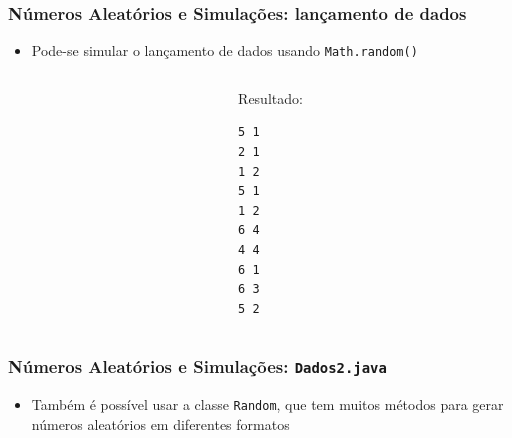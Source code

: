 \documentclass[xcolor={dvipsnames,table},aspectratio=169]{beamer}
\begin{document}
\begin{frame}[fragile]\frametitle{Números Aleatórios e Simulações: lançamento de dados}
\begin{itemize}
	\item Pode-se simular o lançamento de dados usando \texttt{Math.random()}
\end{itemize}
\begin{columns}[T]
	\begin{column}{0.8\linewidth}
		\scriptsize{\inputminted[bgcolor=cyan!10]{java}{src/Dados1.java}}
	\end{column}
	\begin{column}{0.2\linewidth}
{\scriptsize
Resultado:
\begin{verbatim}
5 1
2 1
1 2
5 1
1 2
6 4
4 4
6 1
6 3
5 2
\end{verbatim}
}
	\end{column}
\end{columns}
\end{frame}

\begin{frame}[fragile]\frametitle{Números Aleatórios e Simulações: \texttt{Dados2.java}}
\begin{itemize}
	\item Também é possível usar a classe \texttt{Random}, que tem muitos métodos para gerar números aleatórios em diferentes formatos
\scriptsize{\inputminted[bgcolor=cyan!10]{java}{src/Dados2.java}}
\end{itemize}	
\end{frame}
\end{document}
